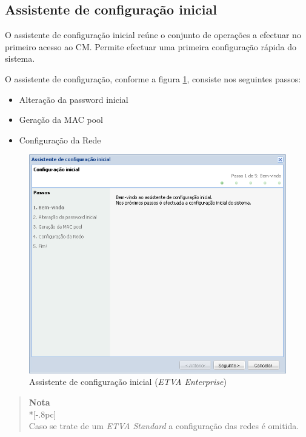 \subsection{Assistente de configuração inicial}
O assistente de configuração inicial reúne o conjunto de operações a efectuar no primeiro acesso ao CM. Permite efectuar uma primeira configuração rápida do sistema.

O assistente de configuração, conforme a figura \ref{fig:first_time_wizard}, consiste nos seguintes passos:
\begin{itemize}
	\item Alteração da password inicial
	\item Geração da MAC pool
	\item Configuração da Rede
\end{itemize}

\begin{figure}[H]
        \begin{center}
        \includegraphics[scale=0.7]{screenshots/first_time_wizard.png}
        \caption{Assistente de configuração inicial (\emph{ETVA Enterprise})}
        \label{fig:first_time_wizard}
        \end{center}
\end{figure}

\begin{quote}
	{\large \bf Nota} \\*[-.8pc]
	\underline{\hspace{6in}} \\
	Caso se trate de um \emph{ETVA Standard} a configuração das redes é omitida.
\end{quote}

